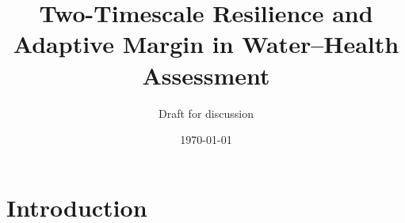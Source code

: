 \newcommand{\drawRasterFeature}{%
\begin{tikzpicture}[scale=0.58]
\cellbox{purpleA}{(0,0)} \cellbox{purpleA}{(0.8,0)} \cellbox{purpleB}{(1.6,0)} \cellbox{purpleB}{(2.4,0)} \cellbox{purpleC}{(3.2,0)}
\cellbox{purpleA}{(0,0.8)} \cellbox{purpleB}{(0.8,0.8)} \cellbox{purpleB}{(1.6,0.8)} \cellbox{purpleC}{(2.4,0.8)} \cellbox{purpleC}{(3.2,0.8)}
\cellbox{purpleB}{(0,1.6)} \cellbox{purpleC}{(0.8,1.6)} \cellbox{purpleC}{(1.6,1.6)} \cellbox{purpleC}{(2.4,1.6)} \cellbox{purpleB}{(3.2,1.6)}
\cellbox{purpleB}{(0,2.4)} \cellbox{purpleC}{(0.8,2.4)} \cellbox{purpleB}{(1.6,2.4)} \cellbox{purpleB}{(2.4,2.4)} \cellbox{purpleA}{(3.2,2.4)}
\cellbox{purpleA}{(0,3.2)} \cellbox{purpleB}{(0.8,3.2)} \cellbox{purpleA}{(1.6,3.2)} \cellbox{purpleA}{(2.4,3.2)} \cellbox{purpleA}{(3.2,3.2)}
\gridframe\rastlabel{$F_{0.95}^G$: feature raster}
\end{tikzpicture}}
\newcommand{\drawClusterRaster}{%
\begin{tikzpicture}[scale=0.58]
\cellbox{clusterone}{(0,0)} \cellbox{clustertwo}{(0.8,0)} \cellbox{clustertwo}{(1.6,0)} \cellbox{clusterfour}{(2.4,0)} \cellbox{clusterfour}{(3.2,0)}
\cellbox{clusterone}{(0,0.8)} \cellbox{clustertwo}{(0.8,0.8)} \cellbox{clusterfour}{(1.6,0.8)} \cellbox{clusterfour}{(2.4,0.8)} \cellbox{clusterfour}{(3.2,0.8)}
\cellbox{clustertwo}{(0,1.6)} \cellbox{clusterthree}{(0.8,1.6)} \cellbox{clusterfour}{(1.6,1.6)} \cellbox{clusterfour}{(2.4,1.6)} \cellbox{clustertwo}{(3.2,1.6)}
\cellbox{clusterthree}{(0,2.4)} \cellbox{clusterthree}{(0.8,2.4)} \cellbox{clusterthree}{(1.6,2.4)} \cellbox{clustertwo}{(2.4,2.4)} \cellbox{clusterone}{(3.2,2.4)}
\cellbox{clusterthree}{(0,3.2)} \cellbox{clusterthree}{(0.8,3.2)} \cellbox{clusterone}{(1.6,3.2)} \cellbox{clusterone}{(2.4,3.2)} \cellbox{clusterone}{(3.2,3.2)}
\gridframe\rastlabel{cluster raster $R(g)$}
\end{tikzpicture}}

\title{Two-Timescale Resilience and Adaptive Margin in Water--Health Assessment}
\author{Draft for discussion}
\date{\today}


\maketitle

\section{Introduction}


